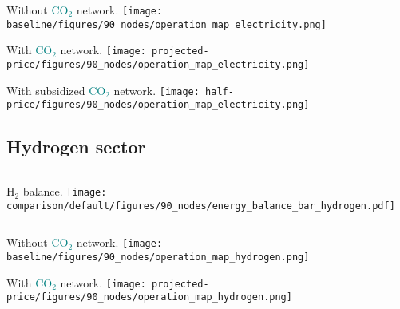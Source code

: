 \documentclass[12pt, aspectratio=169]{beamer}
\newcommand{\carbon}{\textcolor{teal}{CO$_2$}}
\newcommand{\hydrogen}{H$_2$}
\begin{document}
\begin{frame}
    \begin{center}
    Without \carbon{} network.
    \texttt{[image: baseline/figures/90\_nodes/operation\_map\_electricity.png]}
    \end{center}
\end{frame}


\begin{frame}
    \begin{center}
    With \carbon{} network.
    \texttt{[image: projected-price/figures/90\_nodes/operation\_map\_electricity.png]}
    \end{center}
\end{frame}


\begin{frame}
    \begin{center}
    With subsidized \carbon{} network.
    \texttt{[image: half-price/figures/90\_nodes/operation\_map\_electricity.png]}
    \end{center}
\end{frame}



\subsection*{Hydrogen sector}

\begin{frame}
    \begin{columns}
        \hydrogen{} balance.
        \texttt{[image: comparison/default/figures/90\_nodes/energy\_balance\_bar\_hydrogen.pdf]}
    \end{columns}
\end{frame}


\begin{frame}
    \begin{center}
    Without \carbon{} network.
    \texttt{[image: baseline/figures/90\_nodes/operation\_map\_hydrogen.png]}
    \end{center}
\end{frame}


\begin{frame}
    \begin{center}
    With \carbon{} network.
    \texttt{[image: projected-price/figures/90\_nodes/operation\_map\_hydrogen.png]}
    \end{center}
\end{frame}
\end{document}
